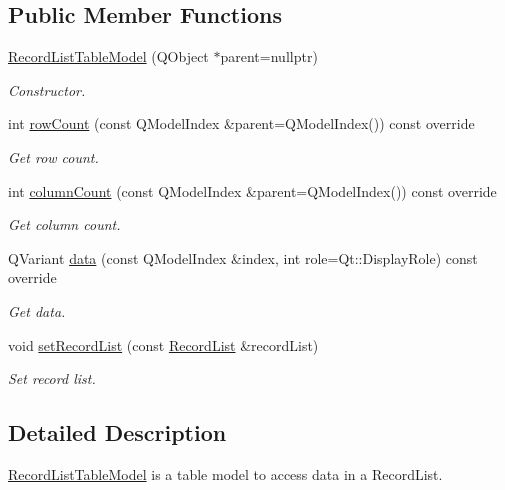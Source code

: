\subsection*{Public Member Functions}
\begin{DoxyCompactItemize}
\item 
\hyperlink{class_mdt_1_1_plain_text_1_1_record_list_table_model_a8f620b5691a0a5e739dbb0fbc511dc3d}{Record\+List\+Table\+Model} (Q\+Object $\ast$parent=nullptr)
\begin{DoxyCompactList}\small\item\em Constructor. \end{DoxyCompactList}\item 
int \hyperlink{class_mdt_1_1_plain_text_1_1_record_list_table_model_a008f00dbfb47b039abaee9a23285ed91}{row\+Count} (const Q\+Model\+Index \&parent=Q\+Model\+Index()) const override
\begin{DoxyCompactList}\small\item\em Get row count. \end{DoxyCompactList}\item 
int \hyperlink{class_mdt_1_1_plain_text_1_1_record_list_table_model_a92b06d3a99bc39778893ea45c41e294d}{column\+Count} (const Q\+Model\+Index \&parent=Q\+Model\+Index()) const override
\begin{DoxyCompactList}\small\item\em Get column count. \end{DoxyCompactList}\item 
Q\+Variant \hyperlink{class_mdt_1_1_plain_text_1_1_record_list_table_model_a21f6d39cf524905be29c3668054d7cc5}{data} (const Q\+Model\+Index \&index, int role=Qt\+::\+Display\+Role) const override
\begin{DoxyCompactList}\small\item\em Get data. \end{DoxyCompactList}\item 
void \hyperlink{class_mdt_1_1_plain_text_1_1_record_list_table_model_ad12757d9766a6e1530cfeb20039dfff6}{set\+Record\+List} (const \hyperlink{class_mdt_1_1_plain_text_1_1_record_list_template}{Record\+List} \&record\+List)
\begin{DoxyCompactList}\small\item\em Set record list. \end{DoxyCompactList}\end{DoxyCompactItemize}


\subsection{Detailed Description}
\hyperlink{class_mdt_1_1_plain_text_1_1_record_list_table_model}{Record\+List\+Table\+Model} is a table model to access data in a Record\+List. 

